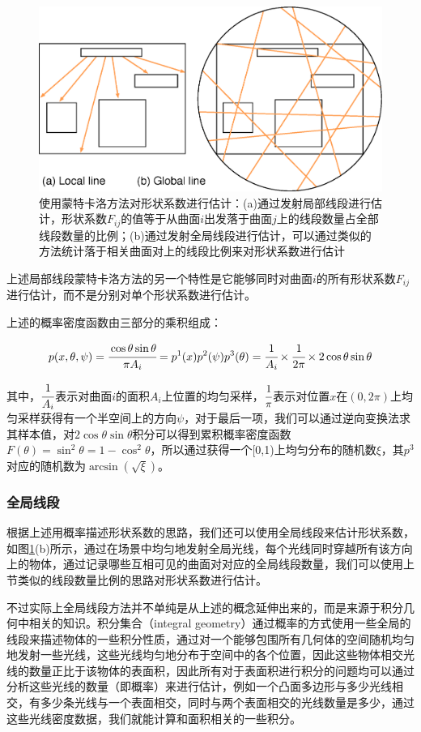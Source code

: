 \begin{figure}
\sidecaption
	\includegraphics[width=.65\textwidth]{figures/r/global-vs-local}
	\caption{使用蒙特卡洛方法对形状系数进行估计：(a)通过发射局部线段进行估计，形状系数$F_{ij}$的值等于从曲面$i$出发落于曲面$j$上的线段数量占全部线段数量的比例；(b)通过发射全局线段进行估计，可以通过类似的方法统计落于相关曲面对上的线段比例来对形状系数进行估计}
	\label{f:r-global-vs-local}
\end{figure}

上述局部线段蒙特卡洛方法的另一个特性是它能够同时对曲面$i$的所有形状系数$F_{ij}$进行估计，而不是分别对单个形状系数进行估计。

上述的概率密度函数由三部分的乘积组成：

\begin{equation}
	p(x,\theta,\psi)= \cfrac{\cos\theta\sin\theta}{\pi A_i}=p^{1}(x)p^{2}(\psi)p^{3}(\theta)= \cfrac{1}{A_i}\times \cfrac{1}{2\pi}\times 2\cos\theta\sin\theta
\end{equation}

\noindent 其中，$ \cfrac{1}{A_i}$表示对曲面$i$的面积$A_i$上位置的均匀采样，$ \cfrac{1}{\pi}$表示对位置$x$在$(0,2\pi)$上均匀采样获得有一个半空间上的方向$\psi$，对于最后一项，我们可以通过逆向变换法求其样本值，对$2\cos\theta\sin\theta$积分可以得到累积概率密度函数$F(\theta)=\sin^{2}\theta=1-\cos^{2}\theta$，所以通过获得一个[0,1)上均匀分布的随机数$\xi$，其$p^{3}$对应的随机数为$\arcsin(\sqrt{\xi})$。




\subsubsection{全局线段}
根据上述用概率描述形状系数的思路，我们还可以使用全局线段来估计形状系数，如图\ref{f:r-global-vs-local}(b)所示，通过在场景中均匀地发射全局光线，每个光线同时穿越所有该方向上的物体，通过记录哪些互相可见的曲面对对应的全局线段数量，我们可以使用上节类似的线段数量比例的思路对形状系数进行估计。

不过实际上全局线段方法并不单纯是从上述的概念延伸出来的，而是来源于积分几何中相关的知识。积分集合（integral geometry）\cite{b:Integralgeometryandgeometricprobability}通过概率的方式使用一些全局的线段来描述物体的一些积分性质，通过对一个能够包围所有几何体的空间随机均匀地发射一些光线，这些光线均匀地分布于空间中的各个位置，因此这些物体相交光线的数量正比于该物体的表面积，因此所有对于表面积进行积分的问题均可以通过分析这些光线的数量（即概率）来进行估计，例如一个凸面多边形与多少光线相交，有多少条光线与一个表面相交，同时与两个表面相交的光线数量是多少，通过这些光线密度数据，我们就能计算和面积相关的一些积分。

